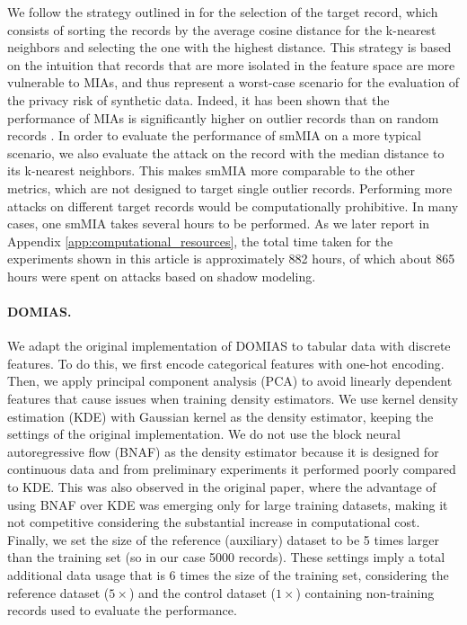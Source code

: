We follow the strategy outlined in \citep{meeus2023achilles} for the selection of the target record, which consists of sorting the records by the average cosine distance for the k-nearest neighbors and selecting the one with the highest distance.
This strategy is based on the intuition that records that are more isolated in the feature space are more vulnerable to MIAs, and thus represent a worst-case scenario for the evaluation of the privacy risk of synthetic data. Indeed, it has been shown that the performance of MIAs is significantly higher on outlier records than on random records \citep{meeus2023achilles}.
In order to evaluate the performance of smMIA on a more typical scenario, we also evaluate the attack on the record with the median distance to its k-nearest neighbors. This makes smMIA more comparable to the other metrics, which are not designed to target single outlier records.
Performing more attacks on different target records would be computationally prohibitive. In many cases, one smMIA takes several hours to be performed. As we later report in Appendix \ref{app:computational_resources}, the total time taken for the experiments shown in this article is approximately 882 hours, of which about 865 hours were spent on attacks based on shadow modeling.

\paragraph{DOMIAS.}
We adapt the original implementation of DOMIAS \citep{van2023membership} to tabular data with discrete features.
To do this, we first encode categorical features with one-hot encoding. Then, we apply principal component analysis (PCA) to avoid linearly dependent features that cause issues when training density estimators.
We use kernel density estimation (KDE) with Gaussian kernel as the density estimator, keeping the settings of the original implementation.
We do not use the block neural autoregressive flow (BNAF) \citep{de2020block} as the density estimator because it is designed for continuous data and from preliminary experiments it performed poorly compared to KDE. This was also observed in the original paper, where the advantage of using BNAF over KDE was emerging only for large training datasets,
making it not competitive considering the substantial increase in computational cost.
Finally, we set the size of the reference (auxiliary) dataset to be 5 times larger than the training set (so in our case 5000 records).
These settings imply a total additional data usage that is 6 times the size of the training set, considering the reference dataset ($5\times$) and the control dataset ($1\times$) containing non-training records used to evaluate the performance.

